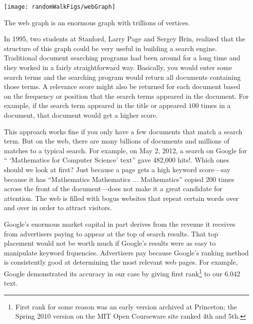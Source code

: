\begin{center}
\texttt{[image: randomWalkFigs/webGraph]}
\end{center}

The web graph is an enormous graph with trillions of vertices.
\iffalse
At first glance, this graph wouldn't seem to be very interesting.  But\fi
In 1995, two students at Stanford,  Larry Page and
 Sergey Brin, realized that the structure of this
graph could be very useful in building a search engine.  Traditional
document searching programs had been around for a long time and they
worked in a fairly straightforward way.  Basically, you would enter
some search terms and the searching program would return all documents
containing those terms.  A relevance score might also be returned for
each document based on the frequency or position that the search terms
appeared in the document.  For example, if the search term appeared in
the title or appeared $100$ times in a document, that document would
get a higher score.  \iffalse
So if an author wanted a document to get a higher
score for certain keywords, he would put the keywords in the title and
make it appear in lots of places.  You can even see this today with
some bogus web sites.\fi

This approach works fine if you only have a few documents that match a
search term.  But on the web, there are many billions of documents and
millions of matches to a typical search.  For example, on May 2, 2012,
a search on Google for `` `Mathematics for Computer Science' text''
gave 482,000 hits!.  Which ones should we look at first?  Just because
a page gets a high keyword score---say because it has ``Mathematics
Mathematics $\dots$ Mathematics'' copied 200 times across the front of
the document---does not make it a great candidate for attention.  The
web is filled with bogus websites that repeat certain words over and
over in order to attract visitors.

\iffalse
One way to get placed high on the list is to pay Google an advertising
fee---and Google gets an enormous revenue stream from these fees.
Of course an early listing is worth a fee only if an advertiser's
target audience is attracted to the listing.  But an audience does get
attracted to Google listings because its ranking method is really good
at determining the most relevant web pages.\fi

Google's enormous market capital in part derives from the revenue it
receives from advertisers paying to appear at the top of search
results.  That top placement would not be worth much if Google's
results were as easy to manipulate keyword frquencies.  Advertisers
pay because Google's ranking method is consistently good at
determining the most relevant web pages.  For example, Google
demonstrated its accuracy in our case by giving first
rank\footnote{First rank for some reason was an early version archived
  at Princeton; the Spring 2010 version on the MIT Open Courseware
  site ranked 4th and 5th.} to our 6.042 text.

